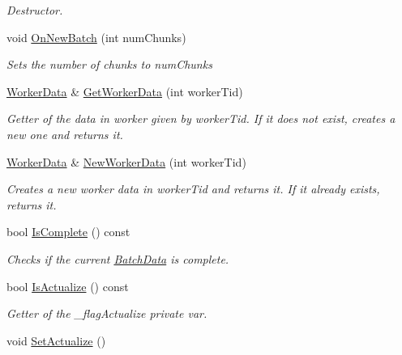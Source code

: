 \begin{DoxyCompactItemize}
\begin{DoxyCompactList}\small\item\em Destructor. \end{DoxyCompactList}\item 
void \hyperlink{class_batch_data_a47092a16aeb1356f6932c7a5ce71c773}{On\-New\-Batch} (int num\-Chunks)
\begin{DoxyCompactList}\small\item\em Sets the number of chunks to {\itshape num\-Chunks} \end{DoxyCompactList}\item 
\hyperlink{class_worker_data}{Worker\-Data} \& \hyperlink{class_batch_data_a73d104e92d0272450f0d799eba8df047}{Get\-Worker\-Data} (int worker\-Tid)
\begin{DoxyCompactList}\small\item\em Getter of the data in worker given by worker\-Tid. If it does not exist, creates a new one and returns it. \end{DoxyCompactList}\item 
\hyperlink{class_worker_data}{Worker\-Data} \& \hyperlink{class_batch_data_a02cba9872dac0dc3e0f622149e14fd8f}{New\-Worker\-Data} (int worker\-Tid)
\begin{DoxyCompactList}\small\item\em Creates a new worker data in worker\-Tid and returns it. If it already exists, returns it. \end{DoxyCompactList}\item 
bool \hyperlink{class_batch_data_a2cb14e2d5412511ee26e5d6a1006d042}{Is\-Complete} () const 
\begin{DoxyCompactList}\small\item\em Checks if the current \hyperlink{class_batch_data}{Batch\-Data} is complete. \end{DoxyCompactList}\item 
bool \hyperlink{class_batch_data_adf1ee749495ff1cd84df96123e15e70a}{Is\-Actualize} () const 
\begin{DoxyCompactList}\small\item\em Getter of the \-\_\-flag\-Actualize private var. \end{DoxyCompactList}\item 
\hypertarget{class_batch_data_a27f36cd98d28c146d5c3f097d0d81fe4}{void \hyperlink{class_batch_data_a27f36cd98d28c146d5c3f097d0d81fe4}{Set\-Actualize} ()}\label{class_batch_data_a27f36cd98d28c146d5c3f097d0d81fe4}


\end{DoxyCompactItemize}
